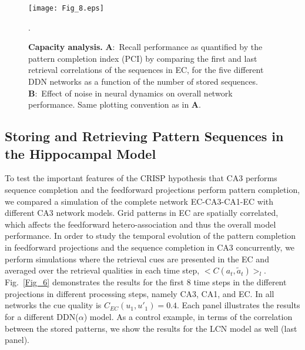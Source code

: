 \documentclass[utf8]{frontiersSCNS} %
\begin{document}
\begin{figure}[!htb]
\centering\texttt{[image: Fig\_8.eps]}
\caption{\textbf{Capacity analysis.} 
\textbf{A}:~Recall performance as quantified by the pattern completion index (PCI) by comparing the first and last retrieval correlations of the sequences in EC, for the five different DDN networks as a function of the number of stored sequences. 
\textbf{B}:~Effect of noise in neural dynamics on overall network performance.
Same plotting convention as in \textbf{A}.
}.   
\label{Fig_8}
\end{figure}


\subsection{Storing and Retrieving Pattern Sequences in the Hippocampal Model}

To test the important features of the CRISP hypothesis that CA3 performs sequence completion and the feedforward projections perform pattern completion, we compared a simulation of the complete network EC-CA3-CA1-EC with different CA3 network models.
%
Grid patterns in EC are spatially correlated, which affects the feedforward hetero-association and thus the overall model performance. 
%
In order to study the temporal evolution of the pattern completion in feedforward projections and the sequence completion in CA3 concurrently,  we perform simulations where the retrieval cues are presented in the EC and averaged over the retrieval qualities in each time step, $<C(a_t, \tilde{a}_t)>_l$.
%
Fig.~\ref{Fig_6} demonstrates the results for the first 8 time steps in the different projections in different processing steps, namely CA3, CA1, and EC. In all networks the cue quality is $C_{EC}(u_1, u'_1) = 0.4$.
%
Each panel illustrates the results for a different DDN($\alpha$) model. As a control example, in terms of the correlation between the stored patterns, we show the results for the LCN model as well (last panel). 
%

\end{document}
